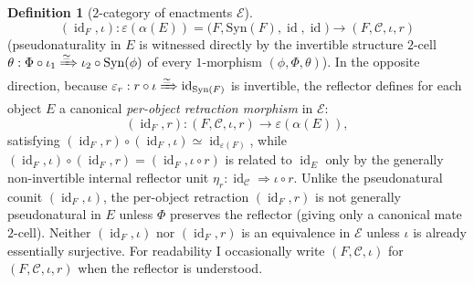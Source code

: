 \documentclass[11pt]{article}
\theoremstyle{plain}
\theoremstyle{definition}
\newtheorem{definition}[theorem]{Definition}
\newcommand{\cC}{\mathcal{C}}
\newcommand{\Syn}{\mathrm{Syn}}
\newcommand{\cE}{\mathcal{E}}
\DeclareMathOperator{\id}{id}
\begin{document}
\begin{definition}[$2$-category of enactments $\cE$]
\[
  (\id_F, \iota) : \varepsilon(\alpha(E)) = \bigl(F, \Syn(F), \id, \id\bigr) \longrightarrow (F, \cC, \iota, r)
\]
(pseudonaturality in $E$ is witnessed directly by the invertible structure $2$-cell $\theta : \Phi \circ \iota_1 \xRightarrow{\simeq} \iota_2 \circ \Syn(\phi)$ of every $1$-morphism $(\phi, \Phi, \theta)$). In the opposite direction, because $\varepsilon_r : r \circ \iota \xRightarrow{\simeq} \id_{\Syn(F)}$ is invertible, the reflector defines for each object $E$ a canonical \emph{per-object retraction morphism} in $\cE$:
\[
  (\id_F, r) : (F, \cC, \iota, r) \longrightarrow \varepsilon(\alpha(E)),
\]
satisfying $(\id_F, r) \circ (\id_F, \iota) \simeq \id_{\varepsilon(F)}$, while $(\id_F, \iota) \circ (\id_F, r) = (\id_F, \iota \circ r)$ is related to $\id_E$ only by the generally non-invertible internal reflector unit $\eta_r : \id_\cC \Rightarrow \iota \circ r$. Unlike the pseudonatural counit $(\id_F, \iota)$, the per-object retraction $(\id_F, r)$ is not generally pseudonatural in $E$ unless $\Phi$ preserves the reflector (giving only a canonical mate $2$-cell). Neither $(\id_F, \iota)$ nor $(\id_F, r)$ is an equivalence in $\cE$ unless $\iota$ is already essentially surjective. For readability I occasionally write $(F, \cC, \iota)$ for $(F, \cC, \iota, r)$ when the reflector is understood.
\end{definition}
\end{document}
